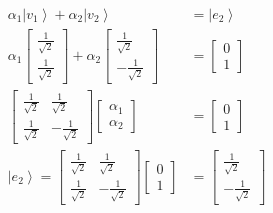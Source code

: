 \documentclass[main.tex]{subfiles}
\begin{document}
\begin{enumerate}
\begin{enumerate}
\begin{align*}
            \alpha_{1}\left|v_{1}\right\rangle+\alpha_{2}\left|v_{2}\right\rangle                               & = \left|e_{2}\right\rangle\\
            \alpha_{1} \left[\begin{array}{l} \frac{1}{\sqrt{2}} \\ \frac{1}{\sqrt{2}} \end{array}\right]
            + \alpha_{2} \left[\begin{array}{l} \frac{1}{\sqrt{2}} \\ -\frac{1}{\sqrt{2}} \end{array}\right]    & = \left[\begin{array}{l} 0 \\ 1 \end{array}\right]\\
            \left[\begin{array}{ll} \frac{1}{\sqrt{2}} & \frac{1}{\sqrt{2}} 
            \\ \frac{1}{\sqrt{2}} & -\frac{1}{\sqrt{2}} \end{array}\right]
            \left[\begin{array}{c} \alpha_{1} \\ \alpha_{2} \end{array}\right]                                  & = \left[\begin{array}{c} 0 \\ 1 \end{array}\right] \tag{matrix is unitary, inverse is the adjoint} \\
            \left|e_{2}\right\rangle = 
            \left[\begin{array}{ll} \frac{1}{\sqrt{2}} & \frac{1}{\sqrt{2}} 
            \\ \frac{1}{\sqrt{2}} & -\frac{1}{\sqrt{2}} \end{array}\right]
            \left[\begin{array}{c} 0 \\ 1 \end{array}\right]                                                    & = \left[\begin{array}{c} \frac{1}{\sqrt{2}} \\ -\frac{1}{\sqrt{2}} \end{array}\right] \tag{new basis}\\
        \end{align*}


\end{enumerate}
\end{enumerate}
\end{document}
